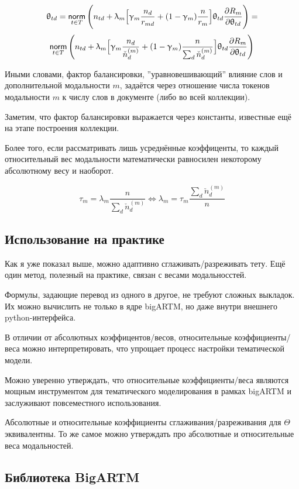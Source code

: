 \[
\uptheta_{td} = \mathop{\mathsf{norm}}\limits_{t \in T} \Bigg( 
    n_{td} + \uplambda_m \Big[
        \upgamma_m \frac{n_d}{r_{md}} + (1-\upgamma_m)\frac{n}{r_m}
        \Big] 
    \uptheta_{td} \frac{\partial R_m}{\partial \uptheta_{td}}
\Bigg) = 
\]
\[
\mathop{\mathsf{norm}}\limits_{t \in T} \Bigg( 
    n_{td} + \uplambda_m \Big[
        \upgamma_m \frac{n_d}{\check{n}_d^{(m)}} + (1-\upgamma_m)\frac{n}{\sum_d \check{n}_d^{(m)}}
        \Big] 
    \uptheta_{td} \frac{\partial R_m}{\partial \uptheta_{td}}
\Bigg)
\]

Иными словами, фактор балансировки, ''уравновешивающий'' влияние слов и дополнительной модальности $m$, задаётся через отношение числа токенов модальности $m$ к числу слов в документе (либо во всей коллекции).

Заметим, что фактор балансировки выражается через константы, известные ещё на этапе построения коллекции.

Более того, если рассматривать лишь усреднённые коэффиценты, то каждый относительный вес модальности математически равносилен некоторому абсолютному весу и наоборот.

\[
\tau_m = \lambda_m \frac{n}{\sum_d \check{n}_d^{(m)}} \iff 
\lambda_m = \tau_m \frac{\sum_d \check{n}_d^{(m)}}{n}
\]


\subsection{Использование на практике}

Как я уже показал выше, можно адаптивно сглаживать/разреживать тету. Ещё один метод, полезный на практике, связан с весами модальносстей.

Формулы, задающие перевод из одного в другое, не требуют сложных выкладок. Их можно вычислить не только в ядре bigARTM, но даже внутри внешнего python-интерфейса.

В отличии от абсолютных коэффицентов/весов, 
относительные коэффициенты/веса можно интерпретировать, что упрощает процесс настройки тематической модели.

Можно уверенно утверждать, что относительные коэффициенты/веса являются мощным инструментом для тематического моделирования в рамках bigARTM и заслуживают повсеместного использования. 

Абсолютные и относительные коэффициенты сглаживания/разреживания для $\Theta$ эквивалентны. То же самое можно утверждать про абсолютные и относительные веса модальностей. 


\subsection{Библиотека BigARTM}


